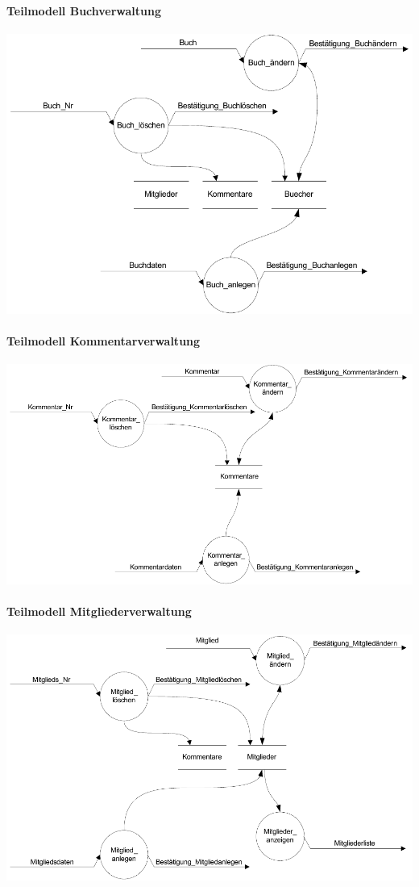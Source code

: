 \paragraph{Teilmodell Buchverwaltung}
\includegraphics[scale=0.93]{teilmodell_buchverwaltung}

\paragraph{Teilmodell Kommentarverwaltung}
\includegraphics[scale=0.93]{teilmodell_kommentarverwaltung}

\paragraph{Teilmodell Mitgliederverwaltung}
\includegraphics[scale=0.85]{teilmodell_mitgliederverwaltung}
\newpage


